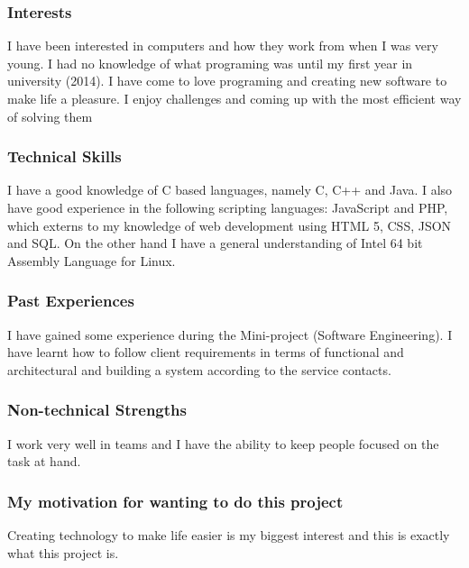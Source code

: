 \documentclass[a4paper,12pt]{article}
\begin{document}
	\subsubsection{Interests}
	I have been interested in computers and how they work from when I was very young. I had no knowledge of what programing was until my first year in university (2014). I have come to love programing and creating new software to make life a pleasure. I enjoy challenges and coming up with the most efficient way of solving them
	
	\subsubsection{Technical Skills}
	I have a good knowledge of C based languages, namely C, C++ and Java. I also have good experience in the following scripting languages: JavaScript and PHP, which externs to my knowledge of web development using HTML 5, CSS, JSON and SQL. On the other hand I have a general understanding of Intel 64 bit Assembly Language for Linux.
	
	\subsubsection{Past Experiences}
	I have gained some experience during the Mini-project (Software Engineering). I have learnt how to follow client requirements in terms of functional and architectural and building a system according to the service contacts. 
	
	\subsubsection{Non-technical Strengths}
	I work very well in teams and I have the ability to keep people focused on the task at hand.
	
	\subsubsection{My motivation for wanting to do this project}
	Creating technology to make life easier is my biggest interest and this is exactly what this project is. 
	
	\newpage
\end{document}
